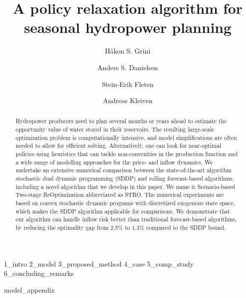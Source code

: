\documentclass[runningheads]{llncs}
\begin{document}
%
\title{A policy relaxation algorithm for seasonal hydropower planning}
%
%
\author{Håkon S. Grini \and
Anders S. Danielsen \and
Stein-Erik Fleten \and
Andreas Kleiven}
%
%
%
\maketitle              %
%
\begin{abstract}
Hydropower producers need to plan several months or years ahead to estimate the opportunity value of water stored in their reservoirs. The resulting large-scale optimization problem is computationally intensive, and model simplifications are often needed to allow for efficient solving. Alternatively, one can look for near-optimal policies using heuristics that can tackle non-convexities in the production function and %
a wide range of modelling approaches for the price- and inflow dynamics. 
We undertake an extensive numerical comparison between the state-of-the-art algorithm stochastic dual dynamic programming (SDDP) and rolling forecast-based algorithms, including a novel algorithm that we develop in this paper. We name it Scenario-based Two-stage ReOptimization abbreviated as STRO.  The numerical experiments are based on convex stochastic dynamic programs with discretized exogenous state space, which makes the SDDP algorithm applicable for comparisons. We demonstrate that our algorithm can handle inflow risk better than traditional forecast-based algorithms, by reducing the optimality gap from 2.5\% to 1.3\% compared to the SDDP bound.

\end{abstract}
%
%
%
{1_intro}
{2_model}
{3_proposed_method}
{4_case}
{5_comp_study}
{6_concluding_remarks}






%
%
%
{}

\appendix
{model_appendix}
% 
%
\end{document}
